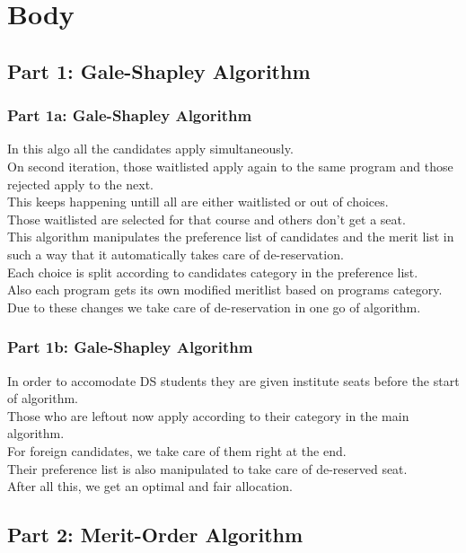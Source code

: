 
\section{Body}

\subsection{Part 1: Gale-Shapley Algorithm}

\begin{frame}
	\frametitle{Part 1a: Gale-Shapley Algorithm}
	In this algo all the candidates apply simultaneously. \cite{java_tutorial} \pause \\
	On second iteration, those waitlisted apply again to the same program and those rejected apply to the next. \pause \\
	This keeps happening untill all are either waitlisted or out of choices. \pause \\
	Those waitlisted are selected for that course and others don't get a seat. \pause \\
	This algorithm manipulates the preference list of candidates and the merit list in such a way that it automatically takes care of de-reservation. \pause \\
	Each choice is split according to candidates category in the preference list. \pause \\
	Also each program gets its own modified meritlist based on programs category. \pause \\
	Due to these changes we take care of de-reservation in one go of algorithm. 
\end{frame}

\begin{frame}
	\frametitle{Part 1b: Gale-Shapley Algorithm}
	In order to accomodate DS students they are given institute seats before the start of algorithm. \pause \\
	Those who are leftout now apply according to their category in the main algorithm. \pause \\ 
	For foreign candidates, we take care of them right at the end. \pause \\
	Their preference list is also manipulated to take care of de-reserved seat. \pause \\
	After all this, we get an optimal and fair allocation. \pause
\end{frame}

\subsection{Part 2: Merit-Order Algorithm}

